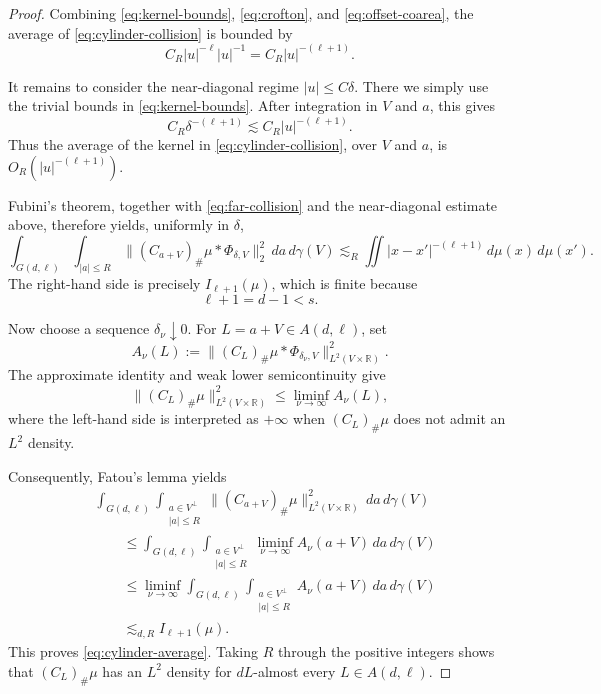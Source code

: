 \documentclass[11pt]{article}
\theoremstyle{remark}
\numberwithin{equation}{section}
\newcommand{\1}{\mathbf 1}
\begin{document}
\begin{proof}
Combining \eqref{eq:kernel-bounds},
\eqref{eq:crofton}, and \eqref{eq:offset-coarea}, the average of
\eqref{eq:cylinder-collision} is bounded by
\begin{equation}
C_R
\lvert u\rvert^{-\ell}
\lvert u\rvert^{-1}
=
C_R
\lvert u\rvert^{-(\ell+1)}.
\label{eq:far-collision}
\end{equation}

It remains to consider the near-diagonal regime
\(\lvert u\rvert\leq C\delta\).  There we simply use the trivial
bounds in \eqref{eq:kernel-bounds}.  After integration in \(V\) and
\(a\), this gives
\[
C_R\delta^{-(\ell+1)}
\lesssim
C_R\lvert u\rvert^{-(\ell+1)}.
\]
Thus the average of the kernel in \eqref{eq:cylinder-collision}, over \(V\)
and \(a\), is \(O_R(\lvert u\rvert^{-(\ell+1)})\).

Fubini's theorem, together with
\eqref{eq:far-collision} and the near-diagonal estimate above,
therefore yields, uniformly in \(\delta\),
\[
\int_{G(d,\ell)}
\int_{\lvert a\rvert\leq R}
\bigl\|
(C_{a+V})_\#\mu*\Phi_{\delta,V}
\bigr\|_2^2
\,da\,d\gamma(V)
\lesssim_R
\iint
\lvert x-x'\rvert^{-(\ell+1)}
\,d\mu(x)\,d\mu(x').
\]
The right-hand side is precisely \(I_{\ell+1}(\mu)\), which is finite
because
\[
\ell+1=d-1<s.
\]

Now choose a sequence \(\delta_\nu\downarrow0\). For
\(L=a+V\in A(d,\ell)\), set
\[
A_\nu(L)
:=
\bigl\|
(C_L)_\#\mu*\Phi_{\delta_\nu,V}
\bigr\|_{L^2(V\times\mathbb R)}^2.
\]
The approximate identity and weak lower
semicontinuity give
\[
\bigl\|(C_L)_\#\mu\bigr\|_{L^2(V\times\mathbb R)}^2
\leq
\liminf_{\nu\to\infty}A_\nu(L),
\]
where the left-hand side is interpreted as \(+\infty\) when
\((C_L)_\#\mu\) does not admit an \(L^2\) density.

Consequently, Fatou's lemma yields
\[
\begin{aligned}
&\int_{G(d,\ell)}
\int_{\substack{a\in V^\perp\\ |a|\leq R}}
\bigl\|
(C_{a+V})_\#\mu
\bigr\|_{L^2(V\times\mathbb R)}^2
\,da\,d\gamma(V)
\\
&\qquad\leq
\int_{G(d,\ell)}
\int_{\substack{a\in V^\perp\\ |a|\leq R}}
\liminf_{\nu\to\infty}A_\nu(a+V)
\,da\,d\gamma(V)
\\
&\qquad\leq
\liminf_{\nu\to\infty}
\int_{G(d,\ell)}
\int_{\substack{a\in V^\perp\\ |a|\leq R}}
A_\nu(a+V)
\,da\,d\gamma(V)
\\
&\qquad\lesssim_{d,R}
I_{\ell+1}(\mu).
\end{aligned}
\]
This proves \eqref{eq:cylinder-average}. Taking \(R\) through the
positive integers shows that \((C_L)_\#\mu\) has an \(L^2\) density
for \(dL\)-almost every \(L\in A(d,\ell)\).  
\end{proof}
\end{document}
